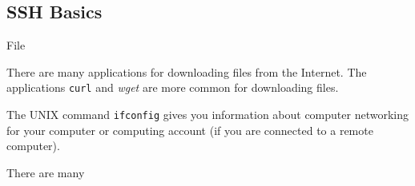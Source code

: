 \subsection{SSH Basics}
\label{ssec:SSHBasics}

File 






There are many applications for downloading files from the Internet. The applications {\tt curl} and {\it wget} are more common for downloading files.

The UNIX command {\tt ifconfig} gives you information about computer networking for your computer or computing account (if you are connected to a remote computer).


There are many 







































